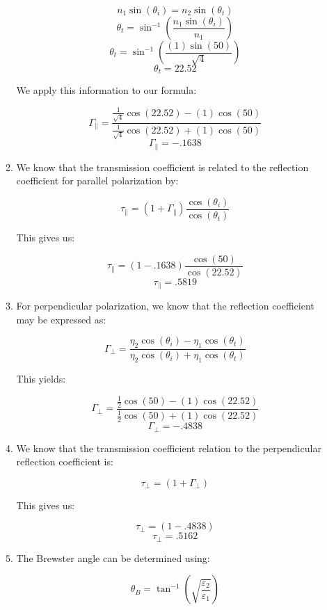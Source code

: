 \begin{enumerate}
\begin{enumerate}
        $$n_1\sin(\theta_i)=n_2\sin(\theta_t)$$
        $$\theta_t=\sin^{-1}\left(\frac{n_1\sin(\theta_i)}{n_1}\right)$$
        $$\theta_t=\sin^{-1}\left(\frac{(1)\sin(50)}{\sqrt{4}}\right)$$
        $$\theta_t=22.52$$

        We apply this information to our formula:

        $$\Gamma_{\parallel}=\frac{\frac{1}{\sqrt{4}}\cos(22.52)-(1)\cos(50)}{\frac{1}{\sqrt{4}}\cos(22.52)+(1)\cos(50)}$$
        $$\boxed{\Gamma_{\parallel}=-.1638}$$


      \item 

        We know that the transmission coefficient is related to the reflection coefficient for parallel polarization by:

        $$\tau_{\parallel}=(1+\Gamma_{\parallel})\frac{\cos(\theta_i)}{\cos(\theta_t)}$$

        This gives us:

        $$\tau_{\parallel}=(1-.1638)\frac{\cos(50)}{\cos(22.52)}$$
        $$\boxed{\tau_{\parallel}=.5819}$$

      \item 

        For perpendicular polarization, we know that the reflection coefficient may be expressed as:

        $$\Gamma_{\perp}=\frac{\eta_2\cos(\theta_i)-\eta_1\cos(\theta_t)}{\eta_2\cos(\theta_i)+\eta_1\cos(\theta_t)}$$

        This yields:

        $$\Gamma_{\perp}=\frac{\frac{1}{2}\cos(50)-(1)\cos(22.52)}{\frac{1}{2}\cos(50)+(1)\cos(22.52)}$$
        $$\boxed{\Gamma_{\perp}=-.4838}$$

      \item 

        We know that the transmission coefficient relation to the perpendicular reflection coefficient is:

        $$\tau_{\perp}=(1+\Gamma_{\perp})$$

        This gives us:

        $$\tau_{\perp}=(1-.4838)$$
        $$\boxed{\tau_{\perp}=.5162}$$

      \item 

        The Brewster angle can be determined using:

        $$\theta_B=\tan^{-1}\left( \sqrt{\frac{\varepsilon_2}{\varepsilon_1}} \right)$$


\end{enumerate}
\end{enumerate}
